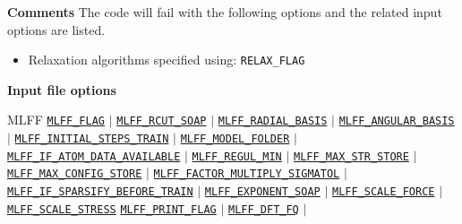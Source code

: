 \begin{frame}[allowframebreaks]{\textbf{Comments}} \label{Introduction}
The code will fail with the following options and the related input options are listed.
\begin{itemize}
  \item Relaxation algorithms specified using: \texttt{RELAX\_FLAG}
\end{itemize}

\end{frame}

\begin{frame}[allowframebreaks]{\textbf{Input file options}} \label{Index}
\vspace{-2mm}
 \begin{block}{MLFF}
\hyperlink{MLFF_FLAG}{\texttt{MLFF\_FLAG}} $\vert$
\hyperlink{MLFF_RCUT_SOAP}{\texttt{MLFF\_RCUT\_SOAP}} $\vert$
\hyperlink{MLFF_RADIAL_BASIS}{\texttt{MLFF\_RADIAL\_BASIS}} $\vert$ 
\hyperlink{MLFF_ANGULAR_BASIS}{\texttt{MLFF\_ANGULAR\_BASIS}} $\vert$ 
\hyperlink{MLFF_INITIAL_STEPS_TRAIN}{\texttt{MLFF\_INITIAL\_STEPS\_TRAIN}} $\vert$ 
\hyperlink{MLFF_MODEL_FOLDER}{\texttt{MLFF\_MODEL\_FOLDER}} $\vert$ 
\hyperlink{MLFF_IF_ATOM_DATA_AVAILABLE}{\texttt{MLFF\_IF\_ATOM\_DATA\_AVAILABLE}}  $\vert$ 
\hyperlink{MLFF_REGUL_MIN}{\texttt{MLFF\_REGUL\_MIN}} $\vert$
\hyperlink{MLFF_MAX_STR_STORE}{\texttt{MLFF\_MAX\_STR\_STORE}} $\vert$ 
\hyperlink{MLFF_MAX_CONFIG_STORE}{\texttt{MLFF\_MAX\_CONFIG\_STORE}} $\vert$ 
\hyperlink{MLFF_FACTOR_MULTIPLY_SIGMATOL}{\texttt{MLFF\_FACTOR\_MULTIPLY\_SIGMATOL}} $\vert$
\hyperlink{MLFF_IF_SPARSIFY_BEFORE_TRAIN}{\texttt{MLFF\_IF\_SPARSIFY\_BEFORE\_TRAIN}} $\vert$
\hyperlink{MLFF_EXPONENT_SOAP}{\texttt{MLFF\_EXPONENT\_SOAP}} $\vert$
\hyperlink{MLFF_SCALE_FORCE}{\texttt{MLFF\_SCALE\_FORCE}} $\vert$
\hyperlink{MLFF_SCALE_STRESS}{\texttt{MLFF\_SCALE\_STRESS}}
\hyperlink{MLFF_PRINT_FLAG}{\texttt{MLFF\_PRINT\_FLAG}} $\vert$
\hyperlink{MLFF_DFT_FQ}{\texttt{MLFF\_DFT\_FQ}} $\vert$ 
\end{block}

\end{frame}
